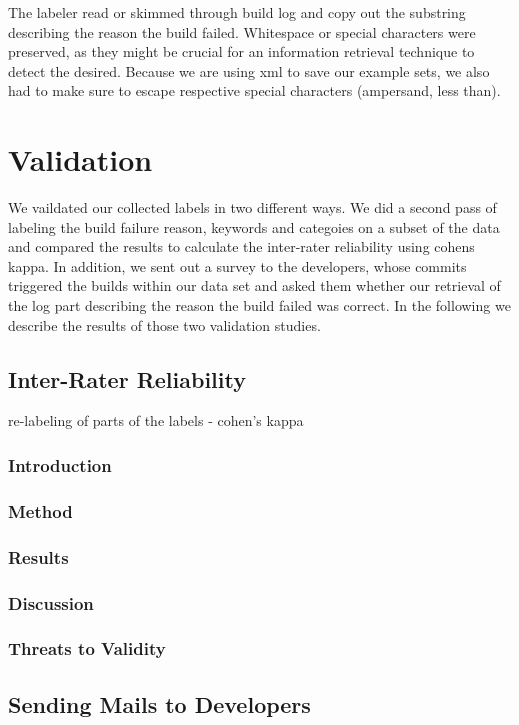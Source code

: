 \documentclass[\myrootdir/main.tex]{subfiles}
\begin{document}
The labeler read or skimmed through build log and copy out the substring describing the reason the build failed. Whitespace or special characters were preserved, as they might be crucial for an information retrieval technique to detect the desired.
Because we are using xml to save our example sets, we also had to make sure to escape respective special characters (ampersand, less than).


\section{Validation}
We vaildated our collected labels in two different ways. We did a second pass of labeling the build failure reason, keywords and categoies on a subset of the data and compared the results to calculate the inter-rater reliability using cohens kappa. In addition, we sent out a survey to the developers, whose commits triggered the builds within our data set and asked them whether our retrieval of the log part describing the reason the build failed was correct. In the following we describe the results of those two validation studies.

\subsection{Inter-Rater Reliability}
re-labeling of parts of the labels - cohen's kappa
\subsubsection{Introduction}
\subsubsection{Method}
\subsubsection{Results}
\subsubsection{Discussion}
\subsubsection{Threats to Validity}

\subsection{Sending Mails to Developers}
\end{document}
